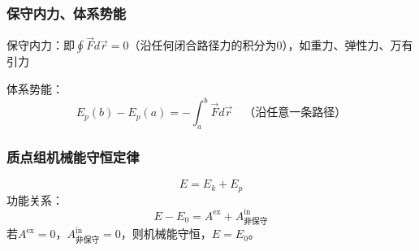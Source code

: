 \subsubsection{保守内力、体系势能}
保守内力：即$\oint\vec{F}d\vec{r}=0$（沿任何闭合路径力的积分为0），如重力、弹性力、万有引力

体系势能：\[E_p(b)-E_p(a)=-\int_a^b\vec{F}d\vec{r}\quad\text{（沿任意一条路径）}\]
\subsubsection{质点组机械能守恒定律}
\[E=E_k+E_p\]
功能关系：\[E-E_0=A^\text{ex}+A^\text{in}_\text{非保守}\]
若$A^\text{ex}=0$，$A^\text{in}_\text{非保守}=0$，则机械能守恒，$E=E_0$。
